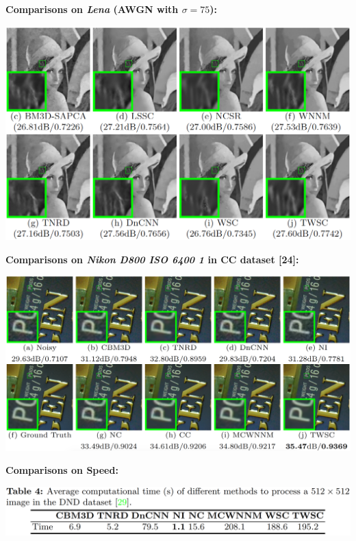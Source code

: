 \documentclass[landscape,fontscale=0.292,archE]{baposter}
\begin{document}
\begin{poster}
{    \vspace{3mm}
    \begin{minipage}[t]{0.45\textwidth}
        \textbf{\color{blue}Comparisons on \textsl{Lena} (AWGN with $\sigma=75$):}
     \vspace{-0mm}
        \begin{center}
            \includegraphics[width=\textwidth]{images/awgn}
        \end{center}
    \end{minipage}
    \hfill
    \begin{minipage}[t]{0.54\textwidth}
            \textbf{\color{blue}Comparisons on \textsl{Nikon D800 ISO 6400 1} in CC dataset [24]:}
        \vspace{-0mm}
        \begin{center}
            \includegraphics[width=\textwidth]{images/realcc}
        \end{center}
    \end{minipage}

\vspace{3mm}
    \begin{minipage}[t]{0.44\textwidth}
     \textbf{\color{blue}Comparisons on Speed:} 
        \vspace{-0mm}
        \begin{center}
            \includegraphics[width=\textwidth]{images/t4}
        \end{center}


\end{minipage}}
\end{poster}
\end{document}
